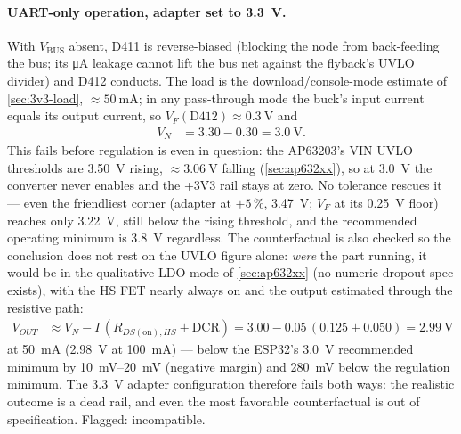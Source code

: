 \paragraph{UART-only operation, adapter set to 3.3~V.} With
$V_{\mathrm{BUS}}$ absent, D411 is reverse-biased (blocking the node from back-feeding
the bus; its \si{\micro\ampere} leakage cannot lift the bus net against the flyback's
UVLO divider) and D412 conducts. The load is the download/console-mode estimate of
\cref{sec:3v3-load}, $\approx\SI{50}{\milli\ampere}$; in any pass-through mode the
buck's input current equals its output current, so $V_F(\mathrm{D412}) \approx
\SI{0.3}{\volt}$ and
\begin{align*}
  V_N &= 3.30 - 0.30 = \SI{3.0}{\volt}.
\end{align*}
This fails before regulation is even in question: the AP63203's VIN UVLO thresholds are
\SI{3.50}{\volt} rising, $\approx\SI{3.06}{\volt}$ falling (\cref{sec:ap632xx}), so at
\SI{3.0}{\volt} the converter never enables and the +3V3 rail stays at zero. No
tolerance rescues it --- even the friendliest corner (adapter at $+5\,\%$,
\SI{3.47}{\volt}; $V_F$ at its \SI{0.25}{\volt} floor) reaches only
\SI{3.22}{\volt}, still below the rising threshold, and the recommended operating
minimum is \SI{3.8}{\volt} regardless. The counterfactual is also checked so the
conclusion does not rest on the UVLO figure alone: \emph{were} the part running, it
would be in the qualitative LDO mode of \cref{sec:ap632xx} (no numeric dropout spec
exists), with the HS FET nearly always on and the output estimated through the
resistive path:
\begin{align*}
  V_{OUT} &\approx V_N - I\,(R_{DS(\mathrm{on}),HS} + \mathrm{DCR})
    = 3.00 - 0.05\,(0.125 + 0.050) = \SI{2.99}{\volt}
\end{align*}
at \SI{50}{\milli\ampere} (\SI{2.98}{\volt} at \SI{100}{\milli\ampere}) --- below the
ESP32's \SI{3.0}{\volt} recommended minimum by \SIrange{10}{20}{\milli\volt}
(negative margin) and \SI{280}{\milli\volt} below the regulation minimum. The
\SI{3.3}{\volt} adapter configuration therefore fails both ways: the realistic outcome
is a dead rail, and even the most favorable counterfactual is out of specification.
Flagged: incompatible.

